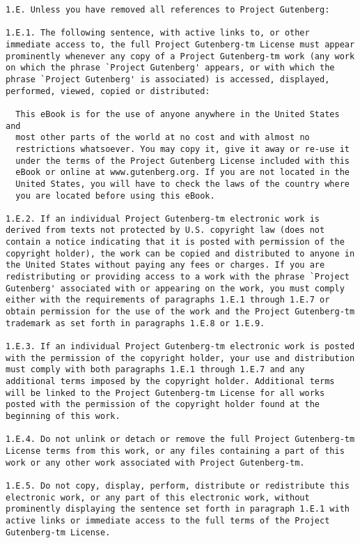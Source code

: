 \documentclass[oneside]{book}
\begin{document}
\begin{verbatim}
1.E. Unless you have removed all references to Project Gutenberg:

1.E.1. The following sentence, with active links to, or other
immediate access to, the full Project Gutenberg-tm License must appear
prominently whenever any copy of a Project Gutenberg-tm work (any work
on which the phrase `Project Gutenberg' appears, or with which the
phrase `Project Gutenberg' is associated) is accessed, displayed,
performed, viewed, copied or distributed:

  This eBook is for the use of anyone anywhere in the United States and
  most other parts of the world at no cost and with almost no
  restrictions whatsoever. You may copy it, give it away or re-use it
  under the terms of the Project Gutenberg License included with this
  eBook or online at www.gutenberg.org. If you are not located in the
  United States, you will have to check the laws of the country where
  you are located before using this eBook.

1.E.2. If an individual Project Gutenberg-tm electronic work is
derived from texts not protected by U.S. copyright law (does not
contain a notice indicating that it is posted with permission of the
copyright holder), the work can be copied and distributed to anyone in
the United States without paying any fees or charges. If you are
redistributing or providing access to a work with the phrase `Project
Gutenberg' associated with or appearing on the work, you must comply
either with the requirements of paragraphs 1.E.1 through 1.E.7 or
obtain permission for the use of the work and the Project Gutenberg-tm
trademark as set forth in paragraphs 1.E.8 or 1.E.9.

1.E.3. If an individual Project Gutenberg-tm electronic work is posted
with the permission of the copyright holder, your use and distribution
must comply with both paragraphs 1.E.1 through 1.E.7 and any
additional terms imposed by the copyright holder. Additional terms
will be linked to the Project Gutenberg-tm License for all works
posted with the permission of the copyright holder found at the
beginning of this work.

1.E.4. Do not unlink or detach or remove the full Project Gutenberg-tm
License terms from this work, or any files containing a part of this
work or any other work associated with Project Gutenberg-tm.

1.E.5. Do not copy, display, perform, distribute or redistribute this
electronic work, or any part of this electronic work, without
prominently displaying the sentence set forth in paragraph 1.E.1 with
active links or immediate access to the full terms of the Project
Gutenberg-tm License.


\end{verbatim}
\end{document}
